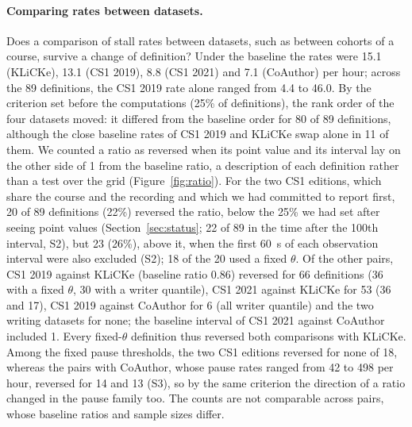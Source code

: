 \paragraph{Comparing rates between datasets.}
\label{sec:res-ratio}
Does a comparison of stall rates between datasets, such as between cohorts of a course, survive a change of
definition? Under the baseline the rates were
15.1 (KLiCKe), 13.1 (CS1 2019), 8.8 (CS1 2021) and 7.1 (CoAuthor) per hour; across the 89 definitions, the CS1 2019
rate alone ranged from 4.4 to 46.0. By the criterion set before the computations (25\% of definitions), the rank
order of the four datasets moved: it differed from the baseline order for 80 of 89 definitions, although the close
baseline rates of CS1 2019 and KLiCKe swap alone in 11 of them. We counted a ratio as reversed when its point value and its
interval lay on the other side of 1 from the baseline ratio, a description of each definition rather than a test over
the grid (Figure~\ref{fig:ratio}). For the two CS1 editions,
which share the course and the recording and which we had committed to report first, 20 of 89 definitions (22\%)
reversed the ratio, below the 25\% we had set after seeing point values (Section~\ref{sec:status}; 22 of 89 in
the time after the 100th interval, S2), but 23 (26\%), above it, when the first 60~s of each observation interval
were also excluded (S2); 18 of the 20 used a fixed $\theta$. Of the other pairs, CS1 2019 against KLiCKe (baseline ratio 0.86) reversed for 66 definitions (36 with a
fixed $\theta$, 30 with a writer quantile), CS1 2021 against KLiCKe for 53 (36 and 17), CS1 2019 against CoAuthor for 6
(all writer quantile) and the two writing datasets for none; the baseline interval of CS1 2021 against CoAuthor
included 1. Every fixed-$\theta$ definition thus reversed both comparisons with KLiCKe. Among the
fixed pause thresholds, the two CS1 editions reversed for none of 18, whereas the pairs with CoAuthor, whose pause rates
ranged from 42 to 498 per hour, reversed for 14 and 13 (S3), so by the same criterion the direction of a ratio changed in the pause family too. The
counts are not comparable across pairs, whose
baseline ratios and sample sizes differ.

